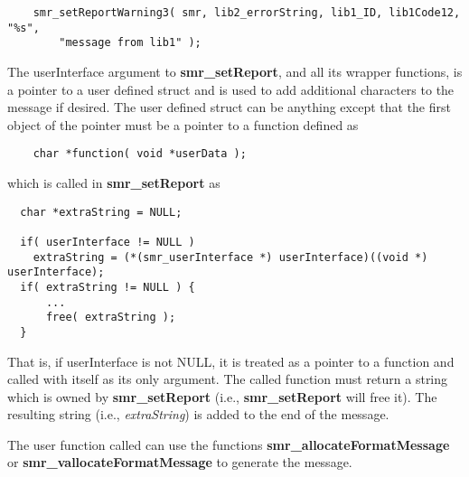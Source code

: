 \documentclass[11pt]{article}
\begin{document}
\begin{verbatim}
    smr_setReportWarning3( smr, lib2_errorString, lib1_ID, lib1Code12, "%s",
        "message from lib1" );
\end{verbatim}

The userInterface argument to \textbf{smr\_setReport}, and all its wrapper functions, is a pointer to a user defined struct
and is used to add additional characters to the message if desired. 
The user defined struct can be anything except that the first object of the pointer must be a pointer to a function defined as
\begin{verbatim}
    char *function( void *userData );
\end{verbatim}
which is called in \textbf{smr\_setReport} as
\begin{verbatim}
  char *extraString = NULL;

  if( userInterface != NULL ) 
    extraString = (*(smr_userInterface *) userInterface)((void *) userInterface);
  if( extraString != NULL ) {
      ...
      free( extraString );
  }
\end{verbatim}
That is, if userInterface is not NULL, it is treated as a pointer to a function and called with itself as its only
argument.  The called function must return a string which is owned by \textbf{smr\_setReport} (i.e., \textbf{smr\_setReport} will free
it). The resulting string (i.e., \textit{extraString}) is added to the end of the message.

The user function called can use the functions \textbf{smr\_allocateFormatMessage} or 
\textbf{smr\_valloc\-ate\-Format\-Message} to generate the message.
\end{document}
